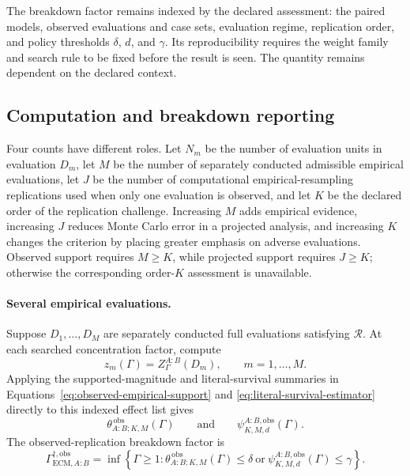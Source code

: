 \documentclass[11pt]{article}
\newcommand{\Regime}{\mathcal{R}}
\theoremstyle{remark}
\begin{document}
The breakdown factor remains indexed by the declared assessment: the paired
models, observed evaluations and case sets, evaluation regime, replication
order, and policy thresholds $\delta$, $d$, and $\gamma$. Its reproducibility
requires the weight family and search rule to be fixed before the result is seen. The quantity
remains dependent on the declared context.

\subsection{Computation and breakdown reporting}

Four counts have different roles. Let $N_m$ be the number of evaluation units
in evaluation $D_m$, let $M$ be the number of separately conducted admissible
empirical evaluations, let $J$ be the number of computational empirical-resampling
replications used when only one evaluation is observed, and let $K$ be the
declared order of the replication challenge. Increasing $M$ adds
empirical evidence, increasing $J$ reduces Monte Carlo error in a projected
analysis, and increasing $K$ changes the criterion by placing greater emphasis
on adverse evaluations. Observed support requires $M\geq K$, while projected
support requires $J\geq K$; otherwise the corresponding order-$K$ assessment
is unavailable.

\paragraph{Several empirical evaluations.}
Suppose $D_1,\ldots,D_M$ are separately conducted full evaluations satisfying
$\Regime$. At each searched concentration factor, compute
\[
z_m(\Gamma)
=
Z_\Gamma^{A:B}(D_m),
\qquad m=1,\ldots,M.
\]
Applying the supported-magnitude and literal-survival summaries in
Equations~\eqref{eq:observed-empirical-support} and
\eqref{eq:literal-survival-estimator} directly to this indexed effect list
gives
\[
\theta_{A:B;K,M}^{\,\mathrm{obs}}(\Gamma)
\qquad\text{and}\qquad
\psi_{K,M,d}^{A:B,\mathrm{obs}}(\Gamma).
\]
The observed-replication breakdown factor is
\begin{equation}
\Gamma_{\mathrm{ECM},A:B}^{\dagger,\mathrm{obs}}
=
\inf\left\{
\Gamma\geq1:
\theta_{A:B;K,M}^{\,\mathrm{obs}}(\Gamma)\leq\delta
\ \text{or}\ 
\psi_{K,M,d}^{A:B,\mathrm{obs}}(\Gamma)\leq\gamma
\right\}.
\label{eq:auroc-ecm-breakdown-observed}
\end{equation}
\end{document}
